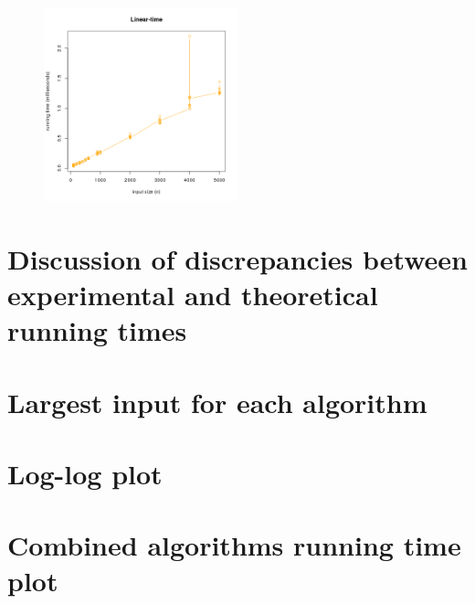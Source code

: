 \documentclass[11pt]{scrreprt}
\begin{document}
\begin{figure}[!htb]
{		\includegraphics[width=0.50\textwidth]{runtime_linear_time.png}%
		\label{fig:1a}%
		\label{fig:1b}%
		\label{fig:1c}%
		\label{fig:1d}%
	}%
	\label{figure1}
\end{figure}



\section{Discussion of discrepancies between experimental and theoretical running times}

\section{Largest input for each algorithm}

\section{Log-log plot}

\section{Combined algorithms running time plot}
\end{document}
